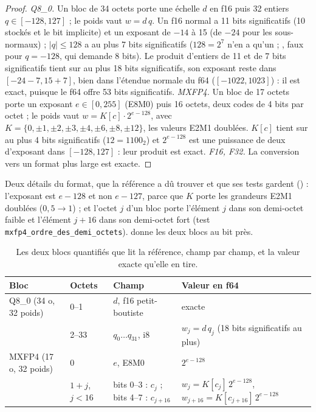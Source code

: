\begin{proof}
\emph{Q8\_0.} Un bloc de 34 octets porte une échelle $d$ en f16 puis 32 entiers $q \in [-128, 127]$ ; le poids vaut $w = d\,q$. Un f16 normal a 11 bits significatifs (10 stockés et le bit implicite) et un exposant de $-14$ à 15 (de $-24$ pour les sous-normaux) ; $|q| \le 128$ a au plus 7 bits significatifs ($128 = 2^7$ n'en a qu'un ; , faux pour $q = -128$, qui demande 8 bits). Le produit d'entiers de 11 et de 7 bits significatifs tient sur au plus 18 bits significatifs, son exposant reste dans $[-24-7, 15+7]$, bien dans l'étendue normale du f64 ($[-1022, 1023]$) : il est exact, puisque le f64 offre 53 bits significatifs.
\emph{MXFP4.} Un bloc de 17 octets porte un exposant $e \in [0, 255]$ (E8M0) puis 16 octets, deux codes de 4 bits par octet ; le poids vaut $w = K[c]\cdot 2^{e-128}$, avec $K = \{0, \pm1, \pm2, \pm3, \pm4, \pm6, \pm8, \pm12\}$, les valeurs E2M1 doublées. $K[c]$ tient sur au plus 4 bits significatifs ($12 = 1100_2$) et $2^{e-128}$ est une puissance de deux d'exposant dans $[-128, 127]$ : leur produit est exact.
\emph{F16, F32.} La conversion vers un format plus large est exacte.
\end{proof}

Deux détails du format, que la référence a dû trouver et que ses tests gardent () : l'exposant est $e - 128$ et non $e - 127$, parce que $K$ porte les grandeurs E2M1 doublées ($0{,}5 \to 1$) ; et l'octet $j$ d'un bloc porte l'élément $j$ dans son demi-octet faible et l'élément $j+16$ dans son demi-octet fort (test \texttt{mxfp4\_ordre\_des\_demi\_octets}).  donne les deux blocs au bit près.

\begin{table}[ht]
\centering\small
\caption[Les deux blocs que lit la référence]{Les deux blocs quantifiés que lit la référence, champ par champ, et la valeur exacte qu'elle en tire.}
\label{tab:t2r-blocs}
\begin{tabular}{@{}llll@{}}
\toprule
Bloc & Octets & Champ & Valeur en f64 \\
\midrule
Q8\_0 (34 o, 32 poids) & 0--1 & $d$, f16 petit-boutiste & exacte \\
 & 2--33 & $q_0 \ldots q_{31}$, i8 & $w_j = d\, q_j$ (18 bits significatifs au plus) \\
\addlinespace
MXFP4 (17 o, 32 poids) & 0 & $e$, E8M0 & $2^{e-128}$ \\
 & $1+j$, $j<16$ & bits 0--3 : $c_j$ ; bits 4--7 : $c_{j+16}$ & $w_j = K[c_j]\,2^{e-128}$, $w_{j+16} = K[c_{j+16}]\,2^{e-128}$ \\
\bottomrule
\end{tabular}
\end{table}

